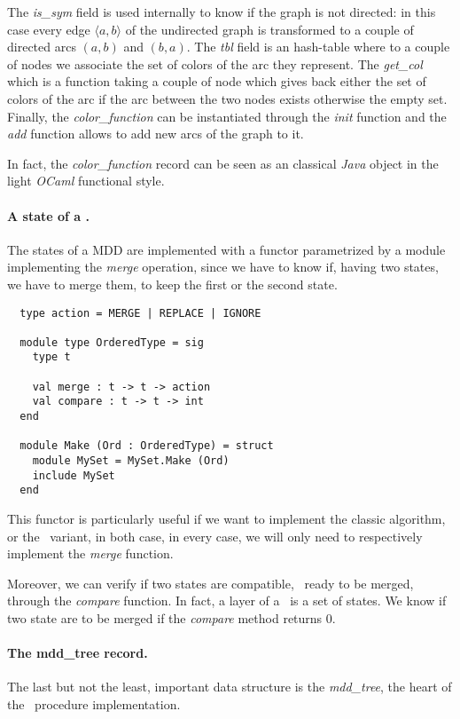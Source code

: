 The \textit{is\_sym} field is used internally to know if the graph is not directed: in this case every edge $\langle a, b \rangle$ of the undirected graph is transformed to a couple of directed arcs $(a,b)$ and $(b,a)$. The \textit{tbl} field is an hash-table where to a couple of nodes we associate the set of colors of the arc they represent. The \textit{get\_col} which is a function taking a couple of node which gives back either the set of colors of the arc if the arc between the two nodes exists otherwise the empty set. Finally, the \textit{color\_function} can be instantiated through the \textit{init} function and the \textit{add} function allows to add new arcs of the graph to it.

In fact, the \textit{color\_function} record can be seen as an classical \textit{Java} object in the light \textit{OCaml} functional style.

\paragraph{A state of a \mdd.} The states of a MDD are implemented with a functor\cite{ocamlfunctor} parametrized by a module implementing the \textit{merge} operation, since we have to know if, having two states, we have to merge them, to keep the first or the second state.

\begin{verbatim}
  type action = MERGE | REPLACE | IGNORE

  module type OrderedType = sig
    type t
  
    val merge : t -> t -> action
    val compare : t -> t -> int
  end
  
  module Make (Ord : OrderedType) = struct
    module MySet = MySet.Make (Ord)
    include MySet
  end
\end{verbatim}

This functor is particularly useful if we want to implement the classic algorithm, or the \alldiff\ variant, in both case, in every case, we will only need to respectively implement the \textit{merge} function.

Moreover, we can verify if two states are compatible, \ie\ ready to be merged, through the \textit{compare} function. In fact, a layer of a \mdd\ is a set of states. We know if two state are to be merged if the \textit{compare} method returns $0$.

\paragraph{The mdd\_tree record.} The last but not the least, important data structure is the \textit{mdd\_tree}, the heart of the \mdd\ procedure implementation.

